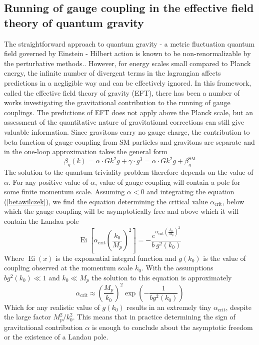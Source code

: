 \documentclass[11pt, a4paper]{article}
\begin{document}
\subsection{Running of gauge coupling in the effective field theory of quantum gravity}
The straightforward approach to quantum gravity - a metric fluctuation quantum field governed by Einstein - Hilbert action
is known to be non-renormalizable by the perturbative methods.\cite{book}. However, for energy scales small
compared to Planck energy, the infinite number of divergent terms in the lagrangian affects predictions in a negligible way and can be effectively ignored.
In this framework, called the effective field theory of gravity (EFT), there has been a number of works investigating
the gravitational contribution to the running of gauge couplings. The predictions of EFT does not apply above
the Planck scale, but an assessment of the quantitative nature of gravitational corrections can still give valuable information.
Since gravitons carry no gauge charge, the contribution to beta function of gauge coupling from SM particles and gravitons are separate
and in the one-loop approximation takes the general form
\begin{equation}
    \beta_g(k) = \alpha \cdot G k^2 g + \gamma \cdot g^3 = \alpha \cdot G k^2 g + \beta_{g}^{\text{SM}}
    \label{betawilczek}
\end{equation}
The solution to the quantum triviality problem therefore depends on the value of $\alpha$.
For any positive value of $\alpha$, value of gauge coupling will contain a pole for some finite momentum scale.
Assuming $\alpha < 0$ and integrating the equation (\ref{betawilczek}), we find the equation determining the critical value $\alpha_{\text{crit}}$, below which the gauge coupling will be asymptotically free and above which it will contain the Landau pole
\begin{equation}
\operatorname{Ei}\left[\alpha_{\text{crit}} \left( \frac{k_0}{M_p} \right)^2 \right]
    = - \frac{e^{\alpha_{\text{crit}} \left( \frac{k_0}{M_p} \right)^2}}{b \ g^2(k_0)}%
\end{equation}
Where $\operatorname{Ei}(x)$ is the exponential integral function and $g(k_0)$ is the value of coupling observed at the momentum scale $k_0$. With the assumptions $b g^2(k_0) \ll 1$ and $k_0 \ll M_p$ the solution to this equation is approximately
\begin{equation}
    \alpha_{\text{crit}} \approx \left( \frac{M_p}{k_0} \right)^2 \operatorname{exp}{\left( - \frac{1}{b g^2(k_0)} \right)}
\end{equation}
Which for any realistic value of $g(k_0)$ results in an extremely tiny $\alpha_{\text{crit}}$, despite the large factor $M_p^2/k_0^2$.
This means that in practice determining the sign of gravitational contribution $\alpha$ is enough to conclude about the asymptotic freedom or the existence of a Landau pole.
\end{document}
